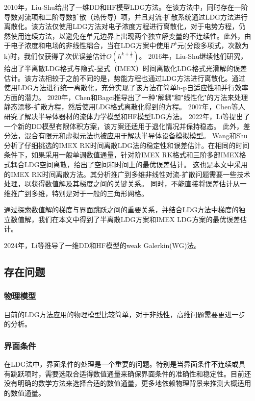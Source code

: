 2010年，Liu-Shu给出了一维DD和HF模型LDG方法\cite{liu2010error}。在该方法中，同时存在一阶导数对流项和二阶导数扩散（热传导）项，并且对流-扩散系统通过LDG方法进行离散化。该方法仅使用LDG方法对电子浓度方程进行离散化，对于电势方程，仍然使用连续方法，以避免在单元边界上出现两个独立解变量的不连续性。此外，由于电子浓度和电场的非线性耦合，当在LDG方案中使用$P^k$元(分段多项式，次数为k)时，我们仅获得了次优误差估计$O(h^{k+\frac{1}{2}})$。
2016年，Liu-Shu继续他们研究，给出了半离散LDG格式与隐式-显式（IMEX）时间离散化LDG格式光滑解的误差估计\cite{liu2016analysis}。该方法相较于之前不同的是，势能方程也通过LDG方法进行离散化。通过使用LDG方法进行统一离散化，充分实现了该方法在简单h-p自适应性和并行效率方面的潜力。
2020年，Chen和Bagci推导出了一种"解耦"和"线性化"的方法来处理静态漂移-扩散方程，然后使用LDG格式离散化得到的方程\cite{chen2020steady}。
2007年，Chen等人研究了解决半导体器材的流体力学模型和HF模型LDG方法\cite{chen2007discontinuous}。
2022年，Li等提出了一个新的DD模型有限体积方案，该方案还适用于退化情况并保持稳态\cite{li2022stabilized}。
此外，差分法\cite{ding2019optimal}，混合有限元\cite{gao2018linearized}和虚拟元法\cite{liu2021virtual}也被应用于解决半导体设备模拟模型。
Wang和Shu分析了仔细挑选的IMEX RK时间离散LDG法的稳定性和误差估计\cite{wang2015stability,wang2016stability}。在相同的时间条件下，如果采用一般单调数值通量，针对阶IMEX RK格式和三阶多部IMEX格式耦合LDG空间离散，给出了空间和时间上的最优误差估计。
这也是本文中采用的IMEX RK时间离散方法。其分析推广到多维非线性对流-扩散问题需要一些技术处理，以获得数值解及其梯度之间的关键关系。
同时，不能直接将误差估计从一维推广到多维，特别是对于一般的三角形网格。

通过探索数值解的梯度与界面跳跃之间的重要关系，并结合LDG方法中梯度的独立数值解，我们在本文中得到了半离散LDG方案和IMEX LDG方案的最优误差估计。

2024年，Li等推导了一维DD和HF模型的weak Galerkin(WG)法\cite{li2024weak}。

\subsection{存在问题}
\subsubsection{物理模型}
目前的LDG方法应用的物理模型比较简单，对于非线性，高维问题需要更进一步的分析。
\subsubsection{界面条件}
在LDG法中，界面条件的处理是一个重要的问题。特别是当界面条件不连续或具有跳跃项时，需要选取合适得数值通量来确保界面条件的准确性和稳定性。目前还没有明确的数学方法来选择合适的数值通量，更多地依赖物理背景来推测大概适用的数值通量。

